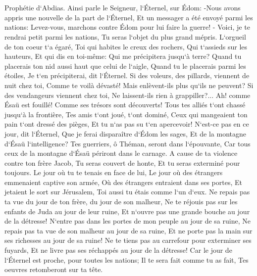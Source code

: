 

\chapter{}

\verse Prophétie d`Abdias. Ainsi parle le Seigneur, l`Éternel, sur Édom: -Nous avons appris une nouvelle de la part de l`Éternel, Et un messager a été envoyé parmi les nations: Levez-vous, marchons contre Édom pour lui faire la guerre! - 
\verse Voici, je te rendrai petit parmi les nations, Tu seras l`objet du plus grand mépris. 
\verse L`orgueil de ton coeur t`a égaré, Toi qui habites le creux des rochers, Qui t`assieds sur les hauteurs, Et qui dis en toi-même: Qui me précipitera jusqu`à terre? 
\verse Quand tu placerais ton nid aussi haut que celui de l`aigle, Quand tu le placerais parmi les étoiles, Je t`en précipiterai, dit l`Éternel. 
\verse Si des voleurs, des pillards, viennent de nuit chez toi, Comme te voilà dévasté! Mais enlèvent-ils plus qu`ils ne peuvent? Si des vendangeurs viennent chez toi, Ne laissent-ils rien à grappiller?... 
\verse Ah! comme Ésaü est fouillé! Comme ses trésors sont découverts! 
\verse Tous tes alliés t`ont chassé jusqu`à la frontière, Tes amis t`ont joué, t`ont dominé, Ceux qui mangeaient ton pain t`ont dressé des pièges, Et tu n`as pas su t`en apercevoir! 
\verse N`est-ce pas en ce jour, dit l`Éternel, Que je ferai disparaître d`Édom les sages, Et de la montagne d`Ésaü l`intelligence? 
\verse Tes guerriers, ô Théman, seront dans l`épouvante, Car tous ceux de la montagne d`Ésaü périront dans le carnage. 
\verse A cause de ta violence contre ton frère Jacob, Tu seras couvert de honte, Et tu seras exterminé pour toujours. 
\verse Le jour où tu te tenais en face de lui, Le jour où des étrangers emmenaient captive son armée, Où des étrangers entraient dans ses portes, Et jetaient le sort sur Jérusalem, Toi aussi tu étais comme l`un d`eux. 
\verse Ne repais pas ta vue du jour de ton frère, du jour de son malheur, Ne te réjouis pas sur les enfants de Juda au jour de leur ruine, Et n`ouvre pas une grande bouche au jour de la détresse! 
\verse N`entre pas dans les portes de mon peuple au jour de sa ruine, Ne repais pas ta vue de son malheur au jour de sa ruine, Et ne porte pas la main sur ses richesses au jour de sa ruine! 
\verse Ne te tiens pas au carrefour pour exterminer ses fuyards, Et ne livre pas ses réchappés au jour de la détresse! 
\verse Car le jour de l`Éternel est proche, pour toutes les nations; Il te sera fait comme tu as fait, Tes oeuvres retomberont sur ta tête. 
